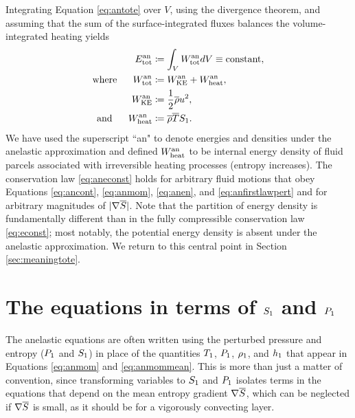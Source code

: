 \documentclass[12pt]{article}
\newcommand{\anetot}{E_{\rm tot}^{\rm an}}
\newcommand{\anwtot}{W^{\rm an}_{\rm tot}}
\newcommand{\anwke}{W^{\rm an}_{\rm KE}}
\newcommand{\anwheat}{W^{\rm an}_{\rm heat}}
\begin{document}
 Integrating Equation \eqref{eq:antote} over $V$, using the divergence theorem, and assuming that the sum of the surface-integrated fluxes balances the volume-integrated heating yields
 \begin{subequations}\label{eq:aneconst}
 	\begin{align}
 		\anetot &\define \int_V \anwtot dV \equiv \text{constant},\\
 		\where \anwtot &\define \anwke + \anwheat,\\
 		\anwke &\define \frac{1}{2}\rhoover u^2,\\
 		\andd \anwheat &\define \rhoover \tmpover S_1.
 	\end{align}
 \end{subequations}
 We have used the superscript ``an" to denote energies and densities under the anelastic approximation and defined $\anwheat$ to be internal energy density of fluid parcels associated with irreversible heating processes (entropy increases). The conservation law \eqref{eq:aneconst} holds for arbitrary fluid motions that obey Equations \eqref{eq:ancont}, \eqref{eq:anmom}, \eqref{eq:anen}, and \eqref{eq:anfirstlawpert} and for arbitrary magnitudes of $|\nabla \overline{S}|$. Note that the partition of energy density is fundamentally different than in the fully compressible conservation law \eqref{eq:econst}; most notably, the potential energy density is absent under the anelastic approximation. We return to this central point in Section \ref{sec:meaningtote}. %

\section{The \citet{Gough1969} equations in terms of $S_1$ and $P_1$}\label{sec:goughsp}
The anelastic equations are often written using the perturbed pressure and entropy ($P_1$ and $S_1$) in place of the quantities $T_1$, $P_1$, $\rho_1$, and $h_1$ that appear in Equations \eqref{eq:anmom} and \eqref{eq:anmommean}. This is more than just a matter of convention, since transforming variables to $S_1$ and $P_1$ isolates terms in the equations that depend on the mean entropy gradient $\nabla\overline{S}$, which can be neglected if $\nabla\overline{S}$ is small, as it should be for a vigorously convecting layer. 
\end{document}
